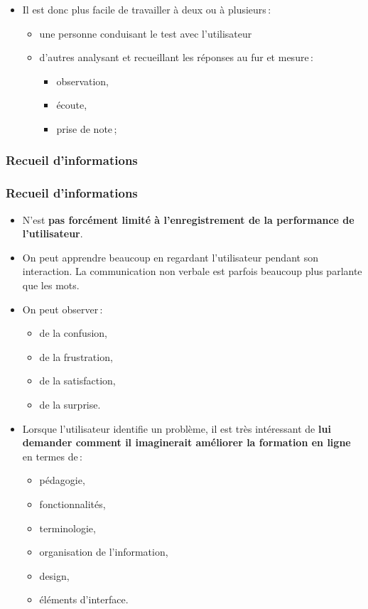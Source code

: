 \begin{frame}[allowframebreaks]
\begin {itemize}
					\framebreak
					\item Il est donc plus facile de travailler à deux ou à plusieurs\,: 
						\begin {itemize}
						\item une personne conduisant le test avec l'utilisateur
						\item d'autres analysant et recueillant les réponses au fur et mesure\,:
							\begin {itemize} 
							\item observation, 
							\item écoute, 
							\item prise de note\,;
							\end{itemize}
						\end{itemize}
					\end{itemize}	
		\end{frame}  
		
		 \subsubsection{Recueil d'informations} 
		
		\begin{frame}[allowframebreaks]
		\frametitle{Recueil d'informations \citep{ergolab2014a}}
					\begin {itemize}
				      \item N'est \textbf{pas forcément limité à l'enregistrement de la performance de l'utilisateur}. 
				      \item On peut apprendre beaucoup en regardant l'utilisateur pendant son interaction. La communication non verbale est parfois beaucoup plus parlante que les mots. 
				      \item On peut observer\,:
				      		\begin {itemize}
				      		\item de la confusion, 
				      		\item de la frustration, 
				      		\item de la satisfaction, 
				      		\item de la surprise. 
				      		\end{itemize}
				      	\item Lorsque l'utilisateur identifie un problème, il est très intéressant de \textbf{lui demander comment il imaginerait améliorer la formation en ligne} en termes de\,: 
				      	\begin {itemize}
				      		\item pédagogie,
				      		\item fonctionnalités,
				      		\item terminologie,
				      		\item organisation de l'information,
				      		\item design,
				      		\item éléments d'interface.
				      		\end{itemize}
				   	\end{itemize}	
		\end{frame}    	 	

